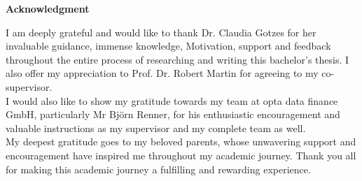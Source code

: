 \begin{center}
    \Large\textbf{Acknowledgment}
\end{center}
\normalsize
I am deeply grateful and would like to thank  Dr. Claudia Gotzes for her invaluable guidance, immense knowledge, Motivation, support and feedback throughout the entire process of researching and writing this bachelor’s thesis.
I also offer my appreciation to Prof. Dr. Robert Martin  for agreeing to  my co-supervisor.\\
I would also like to show my gratitude towards my  team at opta data finance GmbH, particularly Mr Björn Renner, for his enthusiastic encouragement and valuable instructions as my supervisor and my complete team as well.\\
My deepest gratitude goes to my beloved parents, whose unwavering support and
encouragement have inspired me throughout my academic journey. Thank you all for making this academic journey a fulfilling and rewarding experience.

